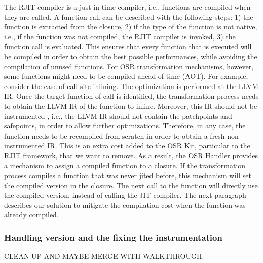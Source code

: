 The RJIT compiler is a just-in-time compiler, i.e., functions are compiled when they are called.
A function call can be described with the following steps: 1) the function is extracted from the closure, 2) if the type of the function is not native, i.e., if the function was not compiled, the RJIT compiler is invoked, 3) the function call is evaluated.
This ensures that every function that is executed will be compiled in order to obtain the best possible performances, while avoiding the compilation of unused functions.
For OSR transformation mechanisms, however, some functions might need to be compiled ahead of time (AOT).
For example, consider the case of call site inlining.
The optimization is performed at the LLVM IR.
Once the target function of call is identified, the transformation process needs to obtain the LLVM IR of the function to inline.
Moreover, this IR should not be instrumented , i.e., the LLVM IR should not contain the patchpoints and safepoints, in order to allow further optimizations.
Therefore, in any case, the function needs to be recompiled from scratch in order to obtain a fresh non instrumented IR. 
This is an extra cost added to the OSR Kit, particular to the RJIT framework, that we want to remove.
As a result, the OSR Handler provides a mechanism to assign a compiled function to a closure. 
If the transformation process compiles a function that was never jited before, this mechanism will set the compiled version in the closure.
The next call to the function will directly use the compiled version, instead of calling the JIT compiler.
The next paragraph describes our solution to mitigate the compilation cost when the function was already compiled.\\


\subsubsection{Handling version and the fixing the instrumentation}
CLEAN UP AND MAYBE MERGE WITH WALKTHROUGH.\\

